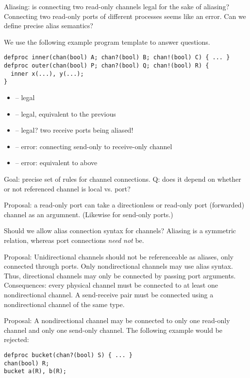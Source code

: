 Aliasing: is connecting two read-only channels legal for the sake of aliasing?
Connecting two read-only ports of different processes seems like an error.
Can we define precise alias semantics?

We use the following example program template to answer questions.  

\begin{verbatim}
defproc inner(chan(bool) A; chan?(bool) B; chan!(bool) C) { ... }
defproc outer(chan(bool) P; chan?(bool) Q; chan!(bool) R) {
  inner x(...), y(...);
}
\end{verbatim}

\begin{itemize}
\item {} -- legal
\item {} -- legal, equivalent to the previous
\item {} -- legal?  two receive ports being aliased!
\item {} -- error: connecting send-only to receive-only channel
\item {} -- error: equivalent to above
\end{itemize}

Goal: precise set of rules for channel connections.
Q: does it depend on whether or not referenced channel is local vs. port?

Proposal: a read-only port can take a directionless or 
read-only port (forwarded) channel as an argumnent.  
(Likewise for send-only ports.)  

Should we allow alias connection syntax for channels?
Aliasing is a symmetric relation, whereas port connections \emph{need not} be.  

Proposal:
Unidirectional channels should not be referenceable as aliases, only
connected through ports.  
Only nondirectional channels may use alias syntax.  
Thus, directional channels may only be connected by passing port arguments.  
Consequences: every physical channel must be connected to at least one
nondirectional channel.  
A send-receive pair must be connected using a nondirectional channel
of the same type.  

Proposal:
A nondirectional channel may be connected to only one read-only channel
and only one send-only channel.  
The following example would be rejected:

\begin{verbatim}
defproc bucket(chan?(bool) S) { ... }
chan(bool) R;
bucket a(R), b(R);
\end{verbatim}

